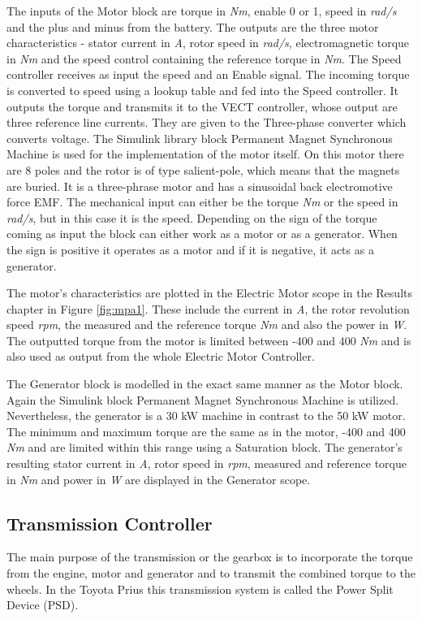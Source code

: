 The inputs of the Motor block are torque in \textit{Nm}, enable 0 or 1, speed in \textit{rad/s} and the plus and minus from the battery. The outputs are the three motor characteristics - stator current in \textit{A}, rotor speed in \textit{rad/s}, electromagnetic torque in \textit{Nm} and the speed control containing the reference torque in \textit{Nm}. The Speed controller receives as input the speed and an Enable signal. The incoming torque is converted to speed using a lookup table and fed into the Speed controller. It outputs the torque and transmits it to the VECT controller, whose output are three reference line currents. They are given to the Three-phase converter which converts voltage. The Simulink library block Permanent Magnet Synchronous Machine \citep{pmsmMatlab} is used for the implementation of the motor itself. On this motor there are 8 poles and the rotor is of type salient-pole, which means that the magnets are buried. It is a three-phrase motor and has a sinusoidal back electromotive force EMF. The mechanical input can either be the torque \textit{Nm} or the speed in \textit{rad/s}, but in this case it is the speed. Depending on the sign of the torque coming as input the block can either work as a motor or as a generator. When the sign is positive it operates as a motor and if it is negative, it acts as a generator. 

The motor's characteristics are plotted in the Electric Motor scope in the Results chapter in Figure \ref{fig:mpa1}. These include the current in \textit{A}, the rotor revolution speed \textit{rpm}, the measured and the reference torque \textit{Nm} and also the power in \textit{W}. The outputted torque from the motor is limited between -400 and 400 \textit{Nm} and is also used as output from the whole Electric Motor Controller.

The Generator block is modelled in the exact same manner as the Motor block. Again the Simulink block Permanent Magnet Synchronous Machine \citep{pmsmMatlab} is utilized. Nevertheless, the generator is a 30 kW machine in contrast to the 50 kW motor. The minimum and maximum torque are the same as in the motor, -400 and 400 \textit{Nm} and are limited within this range using a Saturation block. The generator's resulting stator current in \textit{A}, rotor speed in \textit{rpm}, measured and reference torque in \textit{Nm} and power in \textit{W} are displayed in the Generator scope.

\subsection{Transmission Controller}
The main purpose of the transmission or the gearbox is to incorporate the torque from the engine, motor and generator and to transmit the combined torque to the wheels. In the Toyota Prius this transmission system is called the Power Split Device (PSD). 

